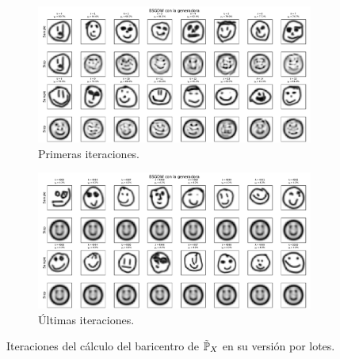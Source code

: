\begin{figure}[htbp]
    \centering
    \begin{subfigure}[b]{0.95\textwidth}
        \includegraphics[width=\textwidth]{img/sgdw-iters/batch-first-iters-GAN.pdf}
        \caption{Primeras iteraciones.}
        \label{fig:batch-first-iters-GAN}
    \end{subfigure}
    \newline
    \begin{subfigure}[b]{0.95\textwidth}
        \includegraphics[width=\textwidth]{img/sgdw-iters/batch-last-iters-GAN.pdf}
        \caption{Últimas iteraciones.}
        \label{fig:batch-last-iters-GAN}
    \end{subfigure}
    \caption{Iteraciones del cálculo del baricentro de $\tilde\Prob_X$ en su versión por lotes.}
    \label{fig:batch-iters-GAN}
\end{figure}


